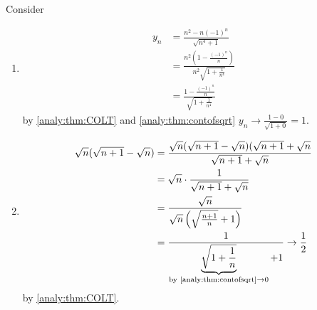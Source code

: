 \documentclass[10pt, a4paper]{article}
\begin{document}
\begin{example}
    Consider
    \begin{enumerate}[label = (\alph*)]
        \item 
        \begin{align*}
            y_n &= \frac{n ^ 2 - n(-1) ^ n}{\sqrt{n ^ 4 + 1}} \\
            &= \frac{n ^ 2 \left(1 - \frac{(-1) ^ n}{n}\right)}{n ^ 2 \sqrt{1 + \frac{1}{n ^ 4}}} \\
            &= \frac{1 - \frac{(-1) ^ n}{n}}{\sqrt{1 + \frac{1}{n ^ 4}}}
        \end{align*}
        by \autoref{analy:thm:COLT} and \autoref{analy:thm:contofsqrt} $y_n \rightarrow \frac{1 - 0}{\sqrt{1 + 0}} = 1$.
        \item
        \begin{align*}
            \sqrt{n}(\sqrt{n + 1} - \sqrt{n}) &= \frac{\sqrt{n}(\sqrt{n + 1} - \sqrt{n})(\sqrt{n + 1} + \sqrt{n}}{\sqrt{n + 1} + \sqrt{n}} \\
            &= \sqrt{n} \cdot \frac{1}{\sqrt{n + 1} + \sqrt{n}} \\
            &= \frac{\sqrt{n}}{\sqrt{n}\left(\sqrt{\frac{n + 1}{n}} + 1\right)} \\
            &= \frac{1}{\underbrace{\sqrt{1 + \frac{1}{n}}}_{\text{by \autoref{analy:thm:contofsqrt}} \rightarrow 0} + 1} \rightarrow \frac{1}{2}
        \end{align*}
        by \autoref{analy:thm:COLT}.
    \end{enumerate}
\end{example}
\end{document}
